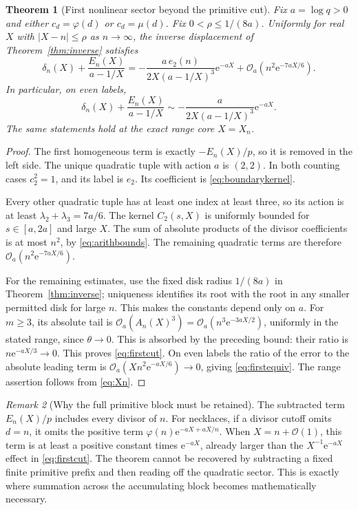 \documentclass[11pt,a4paper]{article}
\numberwithin{equation}{section}
\newtheorem{theorem}{Theorem}[section]
\theoremstyle{definition}
\theoremstyle{remark}
\newtheorem{remark}[theorem]{Remark}
\newcommand{\ee}{\mathrm e}
\newcommand{\bigO}{\mathcal O}
\begin{document}
\begin{theorem}[First nonlinear sector beyond the primitive cut]
\label{thm:firstcut}
Fix $a=\log q>0$ and either $c_d=\varphi(d)$ or $c_d=\mu(d)$.
Fix $0<\rho\le1/(8a)$. Uniformly for real $X$ with $|X-n|\le\rho$
as $n\to\infty$, the inverse displacement of
Theorem~\ref{thm:inverse} satisfies
\begin{equation}
 \delta_n(X)+\frac{E_n(X)}{a-1/X}
 =-\frac{a\,e_2(n)}{2X(a-1/X)^3}\ee^{-aX}
 +\bigO_a\!\left(n^2\ee^{-7aX/6}\right).
 \label{eq:firstcut}
\end{equation}
In particular, on even labels,
\begin{equation}
 \delta_n(X)+\frac{E_n(X)}{a-1/X}
 \sim-\frac{a}{2X(a-1/X)^3}\ee^{-aX}.
 \label{eq:firstequiv}
\end{equation}
The same statements hold at the exact range core $X=X_n$.
\end{theorem}
\begin{proof}
The first homogeneous term is exactly $-E_n(X)/p$, so it is removed
in the left side. The unique quadratic tuple with action $a$ is
$(2,2)$. In both counting cases $c_2^2=1$, and its label is $e_2$.
Its coefficient is \eqref{eq:boundarykernel}.

Every other quadratic tuple has at least one index at least three,
so its action is at least
$\lambda_2+\lambda_3=7a/6$. The kernel $C_2(s,X)$ is uniformly
bounded for $s\in[a,2a]$ and large $X$. The sum of absolute products
of the divisor coefficients is at most $n^2$, by
\eqref{eq:arithbounds}. The remaining quadratic terms are therefore
$\bigO_a(n^2\ee^{-7aX/6})$.

For the remaining estimates, use the fixed disk radius $1/(8a)$ in
Theorem~\ref{thm:inverse}; uniqueness identifies its root with the root
in any smaller permitted disk for large $n$. This makes the constants
depend only on $a$. For $m\ge3$, its absolute tail is
$\bigO_a(A_n(X)^3)=\bigO_a(n^3\ee^{-3aX/2})$, uniformly in the
stated range, since $\theta\to0$. This is absorbed by the preceding
bound: their ratio is $n\ee^{-aX/3}\to0$. This proves
\eqref{eq:firstcut}. On even labels the ratio of the error to the
absolute leading term is
$\bigO_a(Xn^2\ee^{-aX/6})\to0$, giving
\eqref{eq:firstequiv}. The range assertion follows from
\eqref{eq:Xn}.
\end{proof}

\begin{remark}[Why the full primitive block must be retained]
The subtracted term $E_n(X)/p$ includes every divisor of $n$. For
necklaces, if a divisor cutoff omits $d=n$, it omits the positive term
$\varphi(n)\ee^{-aX+aX/n}$. When $X=n+\bigO(1)$, this term is at
least a positive constant times $\ee^{-aX}$, already larger than the
$X^{-1}\ee^{-aX}$ effect in \eqref{eq:firstcut}. The theorem cannot
be recovered by subtracting a fixed finite primitive prefix and then
reading off the quadratic sector. This is exactly where summation
across the accumulating block becomes mathematically necessary.
\end{remark}
\end{document}
